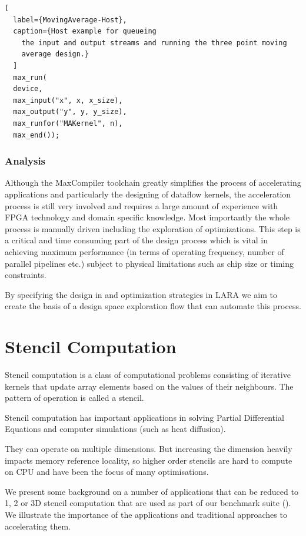 \begin{lstlisting}[
  label={MovingAverage-Host},
  caption={Host example for queueing
    the input and output streams and running the three point moving
    average design.}
  ]
  max_run(
  device,
  max_input("x", x, x_size),
  max_output("y", y, y_size),
  max_runfor("MAKernel", n),
  max_end());
\end{lstlisting}

\subsubsection{Analysis}
Although the MaxCompiler toolchain greatly simplifies the process of
accelerating applications and particularly the designing of dataflow
kernels, the acceleration process is still very involved and requires
a large amount of experience with FPGA technology and domain specific
knowledge. Most importantly the whole process is manually driven
including the exploration of optimizations. This step is a critical
and time consuming part of the design process which is vital in
achieving maximum performance (in terms of operating frequency, number
of parallel pipelines etc.) subject to physical limitations such as
chip size or timing constraints.

By specifying the design in \FAST{} and optimization strategies in LARA
we aim to create the basis of a design space exploration flow that can
automate this process.

\section{Stencil Computation}

Stencil computation is a class of computational problems consisting of
iterative kernels that update array elements based on the values of
their neighbours. The pattern of operation is called a stencil.

Stencil computation has important applications in solving Partial
Differential Equations and computer simulations (such as heat
diffusion).

They can operate on multiple dimensions. But increasing the dimension
heavily impacts memory reference locality, so higher order stencils
are hard to compute on CPU and have been the focus of many
optimisations.

We present some background on a number of applications that can be
reduced to 1, 2 or 3D stencil computation that are used as part of our
benchmark suite (). We illustrate the importance
of the applications and traditional approaches to accelerating them.

